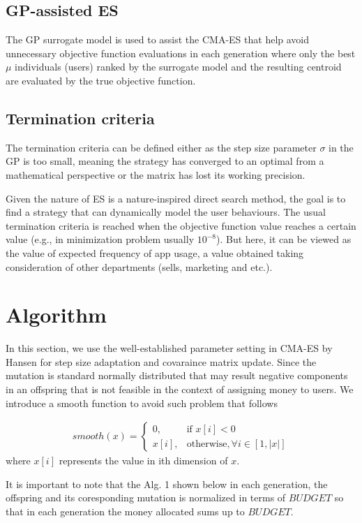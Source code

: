 \documentclass{article}
\begin{document}
\subsection{GP-assisted ES}
The GP surrogate model is used to assist the CMA-ES that help avoid unnecessary objective function evaluations in each generation where only the best $\mu$ individuals (users) ranked by the surrogate model and the resulting centroid are evaluated by the true objective function. 

\subsection{Termination criteria}
The termination criteria can be defined either as the step size parameter $\sigma$ in the GP is too small, meaning the strategy has converged to an optimal from a mathematical perspective or the matrix has lost its working precision. 

Given the nature of ES is a nature-inspired direct search method, the goal is to find a strategy that can dynamically model the user behaviours. The usual termination criteria is reached when the objective function value reaches a certain value (e.g., in minimization problem usually $10^{-8}$). But here, it can be viewed as the value of expected frequency of app usage, a value obtained taking consideration of other departments (sells, marketing and etc.).



\section{Algorithm}
In this section, we use the well-established parameter setting in CMA-ES by Hansen \cite{hansen2016cma} for step size adaptation and covaraince matrix update. Since the mutation is standard normally distributed that may result negative components in an offspring that is not feasible in the context of assigning money to users. We introduce a smooth function to avoid such problem that follows

\begin{align*}
smooth(x) = 
\begin{cases}
0,& \text{if } x[i] <0\\
x[i],&\text{otherwise},\forall i \in [1, \vert x\vert]
\end{cases}
\end{align*}
where $x[i]$ represents the value in ith dimension of $x$.

It is important to note that the Alg. 1 shown below in each generation, the offspring and its coresponding mutation is normalized in terms of $BUDGET$ so that in each generation the money allocated sums up to $BUDGET$.
\end{document}
